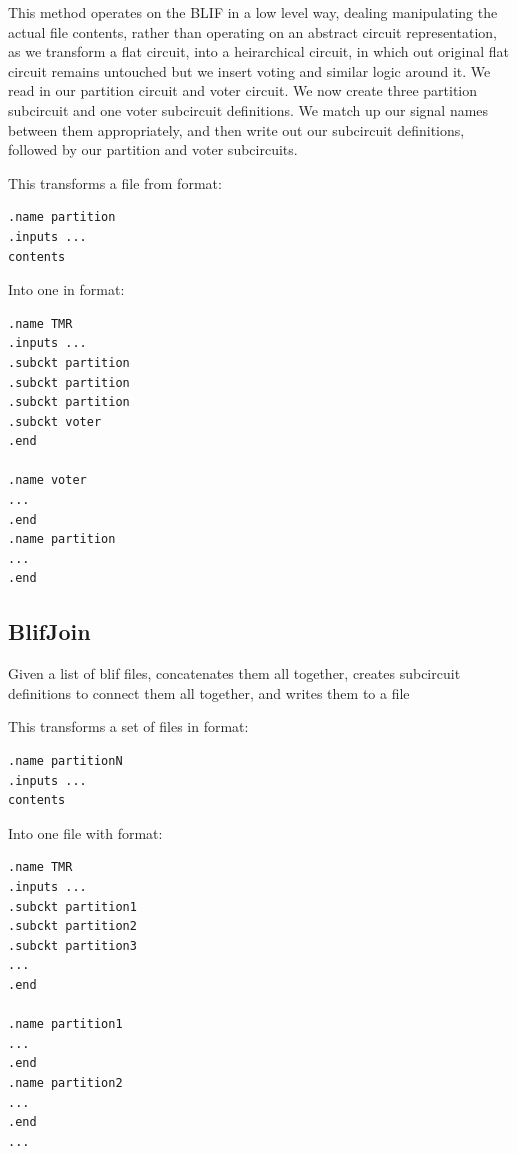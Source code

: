 \documentclass[12pt,final,oneside]{article} %
\begin{document}
This method operates on the \ac{BLIF} in a low level way, dealing manipulating the actual file contents, rather than operating on an abstract circuit representation, as we transform a flat circuit, into a heirarchical circuit, in which out original flat circuit remains untouched but we insert voting and similar logic around it.
We read in our partition circuit and voter circuit. We now create three partition subcircuit and one voter subcircuit definitions. We match up our signal names between them appropriately, and then write out our subcircuit definitions, followed by our partition and voter subcircuits.

This transforms a file from format:
\begin{lstlisting}
.name partition
.inputs ...
contents
\end{lstlisting}
Into one in format:
\begin{lstlisting}
.name TMR
.inputs ...
.subckt partition
.subckt partition
.subckt partition
.subckt voter
.end

.name voter
...
.end
.name partition
...
.end
\end{lstlisting}

\newpage
\subsection{BlifJoin}
Given a list of blif files, concatenates them all together, creates
subcircuit definitions to connect them all together, and writes them to a file

This transforms a set of files in format:
\begin{lstlisting}
.name partitionN
.inputs ...
contents
\end{lstlisting}
Into one file with format:
\begin{lstlisting}
.name TMR
.inputs ...
.subckt partition1
.subckt partition2
.subckt partition3
...
.end

.name partition1
...
.end
.name partition2
...
.end
...
\end{lstlisting}
\newpage
\end{document}
